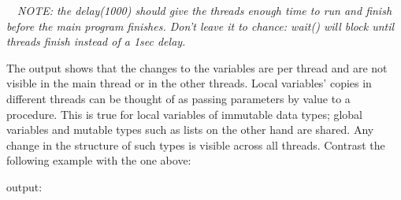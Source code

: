 \ \ \textit{NOTE: the delay(1000) should give the threads enough time to
run and finish before the main program finishes. Don{\textquoteright}t
leave it to chance: wait() will block until threads finish instead of a
1sec delay. }

The output shows that the changes to the variables are per thread and
are not visible in the main thread or in the other threads. Local
variables{\textquoteright} copies in different threads can be thought
of as passing parameters by value to a procedure. This is true for
local variables of immutable data types; global variables and mutable
types such as lists on the other hand are shared. Any change in the
structure of such types is visible across all threads. Contrast the
following example with the one above:


\noindent
output:


